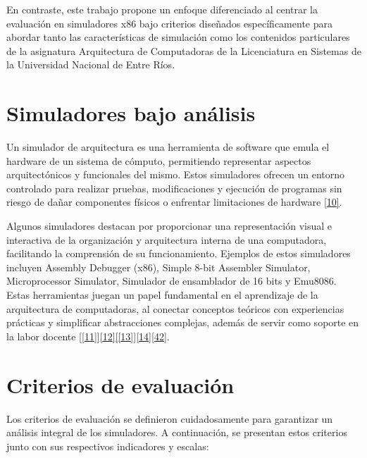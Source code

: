 \documentclass[12pt,oneside]{templates/unerthesis}
\begin{document}
En contraste, este trabajo propone un enfoque diferenciado al centrar la evaluación en simuladores x86 bajo criterios diseñados específicamente para abordar tanto las características de simulación como los contenidos particulares de la asignatura Arquitectura de Computadoras de la Licenciatura en Sistemas de la Universidad Nacional de Entre Ríos.

\hypertarget{simuladores-bajo-anuxe1lisis}{%
\section{Simuladores bajo análisis}\label{simuladores-bajo-anuxe1lisis}}

Un simulador de arquitectura es una herramienta de software que emula el hardware de un sistema de cómputo, permitiendo representar aspectos arquitectónicos y funcionales del mismo. Estos simuladores ofrecen un entorno controlado para realizar pruebas, modificaciones y ejecución de programas sin riesgo de dañar componentes físicos o enfrentar limitaciones de hardware \protect\hyperlink{ref-radivojevic_design_2011}{{[}10{]}}.

Algunos simuladores destacan por proporcionar una representación visual e interactiva de la organización y arquitectura interna de una computadora, facilitando la comprensión de su funcionamiento. Ejemplos de estos simuladores incluyen Assembly Debugger (x86), Simple 8-bit Assembler Simulator, Microprocessor Simulator, Simulador de ensamblador de 16 bits y Emu8086. Estas herramientas juegan un papel fundamental en el aprendizaje de la arquitectura de computadoras, al conectar conceptos teóricos con experiencias prácticas y simplificar abstracciones complejas, además de servir como soporte en la labor docente {[}\protect\hyperlink{ref-nikolic_survey_2009}{{[}11{]}}{]}\protect\hyperlink{ref-hasan_survey_2012}{{[}12{]}}{[}\protect\hyperlink{ref-hennessy_computer_2012}{{[}13{]}}{]}\protect\hyperlink{ref-stallings_computer_2013}{{[}14{]}}\protect\hyperlink{ref-behrooz_computer_2005}{{[}42{]}}.

\hypertarget{criterios-de-evaluaciuxf3n}{%
\section{Criterios de evaluación}\label{criterios-de-evaluaciuxf3n}}

Los criterios de evaluación se definieron cuidadosamente para garantizar un análisis integral de los simuladores. A continuación, se presentan estos criterios junto con sus respectivos indicadores y escalas:
\end{document}
